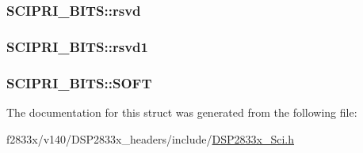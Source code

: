\subsubsection[{rsvd}]{ S\+C\+I\+P\+R\+I\+\_\+\+B\+I\+T\+S\+::rsvd}\label{struct_s_c_i_p_r_i___b_i_t_s_a9f2d1bf2eb826466f5d7cb54363ec80b}
\hypertarget{struct_s_c_i_p_r_i___b_i_t_s_a935e596af893352ddad6dfaa86edc37c}{}
\subsubsection[{rsvd1}]{ S\+C\+I\+P\+R\+I\+\_\+\+B\+I\+T\+S\+::rsvd1}\label{struct_s_c_i_p_r_i___b_i_t_s_a935e596af893352ddad6dfaa86edc37c}
\hypertarget{struct_s_c_i_p_r_i___b_i_t_s_a5c1ce51b9351b53aaad1820b05bfac78}{}
\subsubsection[{S\+O\+F\+T}]{ S\+C\+I\+P\+R\+I\+\_\+\+B\+I\+T\+S\+::\+S\+O\+F\+T}\label{struct_s_c_i_p_r_i___b_i_t_s_a5c1ce51b9351b53aaad1820b05bfac78}


The documentation for this struct was generated from the following file\+:\begin{DoxyCompactItemize}
\item 
f2833x/v140/\+D\+S\+P2833x\+\_\+headers/include/\hyperlink{_d_s_p2833x___sci_8h}{D\+S\+P2833x\+\_\+\+Sci.\+h}\end{DoxyCompactItemize}

